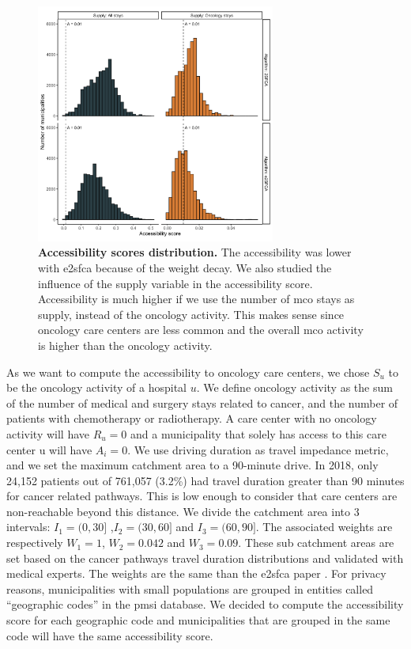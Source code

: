 \begin{figure}[h!]
    \includegraphics[width=0.7\textwidth]{images/camion/sup_fig5_accessibility_distribution.png}
    \centering
    \caption{ \textbf{Accessibility scores distribution.} The accessibility was
        lower with \ac{e2sfca} because of the weight decay. We also studied the
        influence of the supply variable in the accessibility score. Accessibility is
        much higher if we use the number of \ac{mco} stays as supply, instead of the
        oncology activity. This makes sense since oncology care centers are less common
        and the overall \ac{mco} activity is higher than the oncology activity. }
    \label{fig:accessibility-distribution}
\end{figure}

As we want to compute the accessibility to oncology care centers, we chose $S_u$
to be the oncology activity of a hospital $u$. We define oncology activity as
the sum of the number of medical and surgery stays related to cancer, and the
number of patients with chemotherapy or radiotherapy. A care center with no
oncology activity will have $R_u=0$ and a municipality that solely has access to
this care center u will have $A_i=0$. We use driving duration as travel
impedance metric, and we set the maximum catchment area to a 90-minute drive. In
2018, only 24,152 patients out of 761,057 (3.2\%) had travel duration greater
than 90 minutes for cancer related pathways. This is low enough to consider that
care centers are non-reachable beyond this distance. We divide the catchment
area into 3 intervals: $I_1=(0,30]$ ,$I_2=(30,60]$ and $I_3=(60,90]$. The
associated weights are respectively $W_1=1$, $W_2=0.042$ and $W_3=0.09$. These
sub catchment areas are set based on the cancer pathways travel duration
distributions and validated with medical experts. The weights are the same than
the \ac{e2sfca} paper \cite{luo_enhanced_2009}. For privacy reasons,
municipalities with small populations are grouped in entities called
``geographic codes'' in the \ac{pmsi} database. We decided to compute the
accessibility score for each geographic code and municipalities that are grouped
in the same code will have the same accessibility score.

